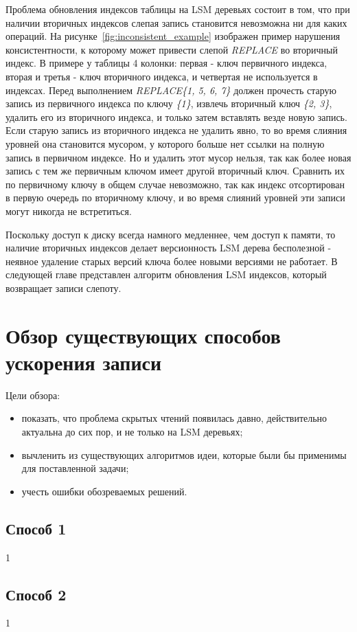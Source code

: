 \documentclass[a4paper,hidelinks,12pt]{article}
\begin{document}
Проблема обновления индексов таблицы на LSM деревьях состоит в том, что при
наличии вторичных индексов слепая запись становится невозможна ни для каких
операций. На рисунке~\ref{fig:inconsistent_example} изображен пример нарушения
консистентности, к которому может привести слепой \textit{REPLACE} во вторичный
индекс. В примере у таблицы 4 колонки: первая - ключ первичного индекса,
вторая и третья - ключ вторичного индекса, и четвертая не используется в
индексах. Перед выполнением \textit{REPLACE\{1, 5, 6, 7\}} должен прочесть
старую запись из первичного индекса по ключу \textit{\{1\}}, извлечь вторичный
ключ \textit{\{2, 3\}}, удалить его из вторичного индекса, и только затем
вставлять везде новую запись. Если старую запись из вторичного индекса не
удалить явно, то во время слияния уровней она становится мусором, у которого
больше нет ссылки на полную запись в первичном индексе. Но и удалить этот мусор
нельзя, так как более новая запись с тем же первичным ключом имеет другой
вторичный ключ. Сравнить их по первичному ключу в общем случае невозможно, так
как индекс отсортирован в первую очередь по вторичному ключу, и во время слияний
уровней эти записи могут никогда не встретиться.

Поскольку доступ к диску всегда намного медленнее, чем доступ к памяти, то
наличие вторичных индексов делает версионность LSM дерева бесполезной - неявное
удаление старых версий ключа более новыми версиями не работает. В следующей
главе представлен алгоритм обновления LSM индексов, который возвращает записи
слепоту.

\section{Обзор существующих способов ускорения записи}
Цели обзора:
\begin{itemize}
\item показать, что проблема скрытых чтений появилась давно, действительно
актуальна до сих пор, и не только на LSM деревьях;
\item вычленить из существующих алгоритмов идеи, которые были бы применимы для
поставленной задачи;
\item учесть ошибки обозреваемых решений.
\end{itemize}

\subsection{Способ 1}
1

\subsection{Способ 2}
1
\end{document}

